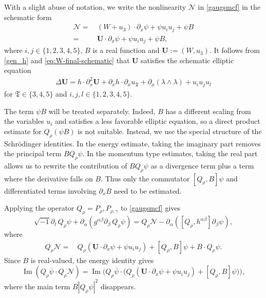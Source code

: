 \documentclass[11pt,letterpaper,reqno]{amsart}
\numberwithin{equation}{section}
\theoremstyle{definition}
\theoremstyle{remark}
\newcommand{\pa}{\partial}
\begin{document}
 With a slight abuse of notation, we write the nonlinearity
\(\mathcal N\) in \eqref{gaugsmcf} in the schematic form
\begin{align} \label{Gen_N}
		\mathcal{N}=&\, (W+u_3) \cdot \partial_x \psi+\psi  u_i u_j +  \psi  B\nonumber\\
		=&\, \mathbf{U} \cdot \partial_x \psi+\psi  u_i u_j +  \psi  B,
	\end{align}
where  $ i,j\in\{1,2,3,4,5\} $, $  B $ is a real function and \(\mathbf{U}:=(W,u_3)\). It follows from \eqref{gen_h} and
\eqref{eq:W-final-schematic} that \(\mathbf U\) satisfies the schematic
elliptic equation
\begin{align}
    \Delta \mathbf{U} =h\cdot\partial_x^2 \mathbf{U}
+
 \partial_xh\cdot\partial_xu_{\mathfrak T}+
\partial_x(\lambda\wedge\lambda)
+
u_i u_j u_l \label{eq_U}
\end{align}
 for \(\mathfrak{T}\in\{3,4,5\}\) and $ i,j,l\in\{1,2,3,4,5\} $.

The term $\psi B$ will be treated separately. Indeed, $B$ has a different
scaling from the variables $u_i$ and satisfies a less favorable elliptic
equation, so a direct product estimate for $Q_\rho(\psi B)$ is not suitable.
Instead, we use the special structure of the Schr\"odinger identities. In the
energy estimate, taking the imaginary part removes the principal term
$B Q_\rho\psi$. In the momentum type estimates, taking the real part allows
us to rewrite the contribution of $B Q_\rho\psi$ as a divergence term plus a
term where the derivative falls on $B$. Thus only the commutator
$[Q_\rho,B]\psi$ and differentiated terms involving $\partial_xB$ need to be
estimated.


Applying the operator $Q_\rho = P_{\rho}, P_{\rho,\gamma}$ to \eqref{gaugsmcf} gives
\begin{equation}\label{Q_psi}
\sqrt{-1}\pa_t \, Q_\rho \psi + \pa_\alpha (g^{\alpha\beta}\pa_\beta \, Q_\rho\psi) = Q_{\rho} \mathcal{N}- \partial_{ \alpha}  ([Q_{\rho}, h^{\alpha \beta}]  \partial_{ \beta}\psi   ),
\end{equation}
 where   
\begin{align}
\label{non_B}
    Q_\rho \mathcal{N} = &\,Q_\rho (\mathbf{U} \cdot \partial_x \psi+\psi  u_i u_j)  + [Q_\rho,B]\psi + B\cdot Q_\rho \psi.
 \end{align}
 Since $B$ is real-valued, the energy identity gives
\begin{equation}
         \operatorname{Im}(Q_\rho \overline{\psi}\cdot  Q_\rho \mathcal{N})= \operatorname{Im}\big( Q_\rho \overline{\psi} \cdot  \big(Q_\rho (\mathbf{U} \cdot \partial_x \psi+\psi  u_i u_j)  + [Q_\rho,B]\psi \big)\label{energy_B}\big),
\end{equation}
where the main term $B|Q_\rho\psi|^2$ disappears.
\end{document}
